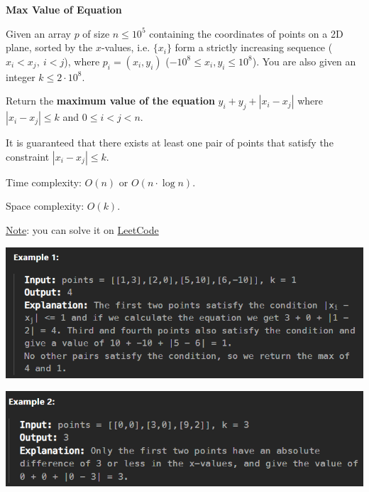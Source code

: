 \begin{problem}\textbf{Max Value of Equation}

    Given an array $p$ of size $n \leq 10^5$ containing the coordinates of points on a 2D plane, sorted by the $x$-values, i.e. $\{ x_i \}$ form a strictly increasing sequence ($x_i < x_j, \ i < j$), where $p_i = (x_i, y_i)$ ($-10^8 \leq x_i, y_i \leq 10^8$). You are also given an integer $k \leq 2\cdot 10^8$.

    Return the \textbf{maximum value of the equation} $y_i + y_j + |x_i - x_j|$ where $|x_i - x_j| \leq k$ and $0 \leq i < j < n$.

    It is guaranteed that there exists at least one pair of points that satisfy the constraint $|x_i - x_j| \leq k$.

    Time complexity: $O(n)$ or $O(n \cdot \log{n})$.

    Space complexity: $O(k)$.\newline

    \underline{Note}: you can solve it on \href{https://leetcode.com/problems/max-value-of-equation/description/}{LeetCode}

    \includegraphics[scale=0.6]{./assets/05-basic-data-structures/2-1.PNG}

    \includegraphics[scale=0.6]{./assets/05-basic-data-structures/2-2.PNG}

\end{problem}


\begin{solution}


\end{solution}